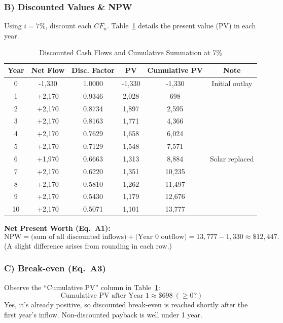 \documentclass[12pt]{report}
\begin{document}
\subsubsection{B) Discounted Values \& NPW}
Using $i=7\%$, discount each $CF_n$. Table~\ref{tab:discountedCF} details the present value (PV) in each year.

\begin{table}[h]
\centering
\caption{Discounted Cash Flows and Cumulative Summation at 7\%}
\label{tab:discountedCF}
\begin{tabular}{@{}cccccc@{}}
\toprule
\textbf{Year} & \textbf{Net Flow} & \textbf{Disc. Factor} & \textbf{PV} & \textbf{Cumulative PV} & \textbf{Note} \\
\midrule
0 & -1,330 & 1.0000 & -1,330 & -1,330 & Initial outlay \\
1 & +2,170 & 0.9346 & 2,028 & 698 & \\
2 & +2,170 & 0.8734 & 1,897 & 2,595 & \\
3 & +2,170 & 0.8163 & 1,771 & 4,366 & \\
4 & +2,170 & 0.7629 & 1,658 & 6,024 & \\
5 & +2,170 & 0.7129 & 1,548 & 7,571 & \\
6 & +1,970 & 0.6663 & 1,313 & 8,884 & Solar replaced \\
7 & +2,170 & 0.6220 & 1,351 & 10,235 & \\
8 & +2,170 & 0.5810 & 1,262 & 11,497 & \\
9 & +2,170 & 0.5430 & 1,179 & 12,676 & \\
10 & +2,170 & 0.5071 & 1,101 & 13,777 & \\
\bottomrule
\end{tabular}
\end{table}

\noindent
\textbf{Net Present Worth (Eq.~A1):}
\[
\text{NPW} 
= \text{(sum of all discounted inflows)} + \text{(Year 0 outflow)}
= 13{,}777 - 1{,}330 \approx \$12{,}447.
\]
(A slight difference arises from rounding in each row.)

\subsubsection{C) Break-even (Eq.~A3)}
Observe the “Cumulative PV” column in Table~\ref{tab:discountedCF}:
\[
\text{Cumulative PV after Year 1} \approx \$698 \ (\ge0?)
\]
Yes, it’s already positive, so discounted break-even is reached shortly after the first year’s inflow. Non-discounted payback is well under 1 year.
\end{document}

